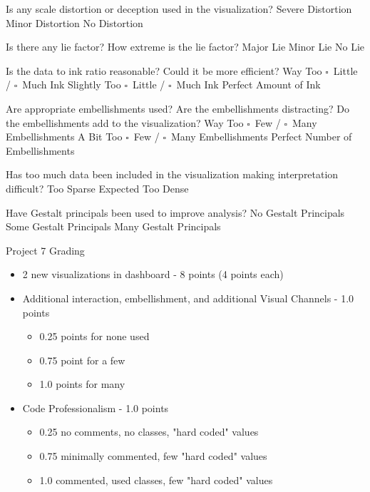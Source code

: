 \documentclass[a4paper,12pt]{article}
\begin{document}
        
\EndTable  



	{Is any scale distortion or deception used in the visualization?}	
	{\choice Severe Distortion}
	{\choice Minor Distortion}
	{\choice No Distortion} 
        
	{Is there any lie factor? How extreme is the lie factor?}
	{\choice Major Lie}
	{\choice Minor Lie}
	{\choice No Lie} 

	{Is the data to ink ratio reasonable? Could it be more efficient?}
	{Way Too $\square$~Little / $\square$~Much Ink}
	{Slightly Too $\square$~Little / $\square$~Much Ink}
	{\choice Perfect Amount of Ink} 
        
	{Are appropriate embellishments used? Are the embellishments 
    	distracting? Do the embellishments add to the visualization?}
	{Way Too $\square$~Few / $\square$~Many Embellishments}
	{A Bit Too $\square$~Few / $\square$~Many Embellishments}
	{\choice Perfect Number of Embellishments} 
        
	{Has too much data been included in the visualization making 
    	interpretation difficult? } 
	{\choice Too Sparse}
	{\choice Expected}
	{\choice Too Dense} 
        
	{Have Gestalt principals been used to improve analysis?}
	{\choice No Gestalt Principals}
	{\choice Some Gestalt Principals}
	{\choice Many Gestalt Principals} 
        
\EndTable  
 



\newpage


\begin{center}
{\huge Project 7 Grading}
\end{center}

\begin{itemize}
	\item 2 new visualizations in dashboard - 8 points (4 points each)
	\item Additional interaction, embellishment, and additional Visual Channels - 1.0 points 
		\begin{itemize}
    		\item 0.25 points for none used
    		\item 0.75 point for a few
            \item 1.0 points for many
		\end{itemize}
	\item Code Professionalism - 1.0 points
		\begin{itemize}
            \item 0.25 no comments, no classes, "hard coded" values
            \item 0.75 minimally commented, few "hard coded" values
            \item 1.0 commented, used classes, few "hard coded" values
		\end{itemize}
\end{itemize}
\end{document}
